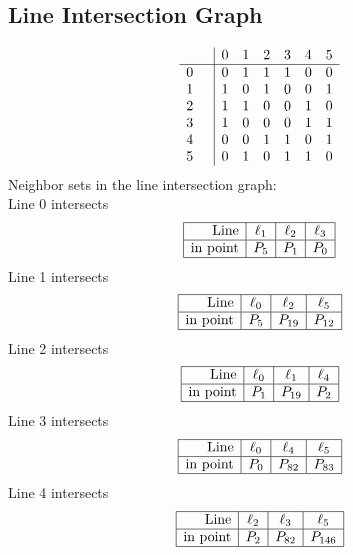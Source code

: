\documentclass{article}
\begin{document}
{\subsection*{Line Intersection Graph}
{\arraycolsep=1pt
$$
\begin{array}{rr|*{6}r}
 &  & 0 & 1 & 2 & 3 & 4 & 5\\
\hline
0 &  & 0 & 1 & 1 & 1 & 0 & 0\\
1 &  & 1 & 0 & 1 & 0 & 0 & 1\\
2 &  & 1 & 1 & 0 & 0 & 1 & 0\\
3 &  & 1 & 0 & 0 & 0 & 1 & 1\\
4 &  & 0 & 0 & 1 & 1 & 0 & 1\\
5 &  & 0 & 1 & 0 & 1 & 1 & 0\\
\end{array}
$$
}%
Neighbor sets in the line intersection graph:\\
Line 0 intersects 
$$
\begin{array}{|r*{3}{|c}|}
\hline
\mbox{Line}  & \ell_{1} & \ell_{2} & \ell_{3}\\
\hline
\mbox{in point}  & P_{5} & P_{1} & P_{0}\\
\hline
\end{array}
$$
Line 1 intersects 
$$
\begin{array}{|r*{3}{|c}|}
\hline
\mbox{Line}  & \ell_{0} & \ell_{2} & \ell_{5}\\
\hline
\mbox{in point}  & P_{5} & P_{19} & P_{12}\\
\hline
\end{array}
$$
Line 2 intersects 
$$
\begin{array}{|r*{3}{|c}|}
\hline
\mbox{Line}  & \ell_{0} & \ell_{1} & \ell_{4}\\
\hline
\mbox{in point}  & P_{1} & P_{19} & P_{2}\\
\hline
\end{array}
$$
Line 3 intersects 
$$
\begin{array}{|r*{3}{|c}|}
\hline
\mbox{Line}  & \ell_{0} & \ell_{4} & \ell_{5}\\
\hline
\mbox{in point}  & P_{0} & P_{82} & P_{83}\\
\hline
\end{array}
$$
Line 4 intersects 
$$
\begin{array}{|r*{3}{|c}|}
\hline
\mbox{Line}  & \ell_{2} & \ell_{3} & \ell_{5}\\
\hline
\mbox{in point}  & P_{2} & P_{82} & P_{146}\\
\hline
\end{array}
$$}
\end{document}
